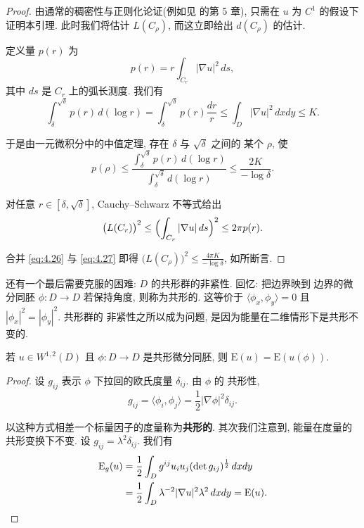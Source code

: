 \begin{proof}
由通常的稠密性与正则化论证(例如见 \cite{Ev} 的第 5 章), 只需在 $u$ 为
$C^1$ 的假设下证明本引理. 此时我们将估计 $L(C_\rho)$, 而这立即给出
$d(C_\rho)$ 的估计.

定义量 $p(r)$ 为
\begin{equation}
p(r)=r\int_{C_r}|\nabla u|^2\,ds,
\label{eq:4.24}
\end{equation}
其中 $ds$ 是 $C_r$ 上的弧长测度. 我们有
\begin{equation}
\int_\delta^{\sqrt{\delta}}p(r)\,d(\log r)
 =\int_\delta^{\sqrt{\delta}}p(r)\frac{dr}{r}
 \leq\int_D|\nabla u|^2\,dxdy\leq K.
\label{eq:4.25}
\end{equation}

于是由一元微积分中的中值定理, 存在 $\delta$ 与 $\sqrt{\delta}$ 之间的
某个 $\rho$, 使
\begin{equation}
p(\rho)\leq
 \frac{\int_\delta^{\sqrt{\delta}}p(r)\,d(\log r)}
      {\int_\delta^{\sqrt{\delta}}d(\log r)}
 \leq\frac{2K}{-\log\delta}.
\label{eq:4.26}
\end{equation}

对任意 $r\in[\delta,\sqrt{\delta}]$, Cauchy--Schwarz 不等式给出
\begin{equation}
\bigl(L(C_r)\bigr)^2\leq\Bigl(\int_{C_r}|\nabla u|\,ds\Bigr)^2
 \leq 2\pi p(r).
\label{eq:4.27}
\end{equation}

合并 \eqref{eq:4.26} 与 \eqref{eq:4.27} 即得
$\bigl(L(C_\rho)\bigr)^2\leq\frac{4\pi K}{-\log\delta}$, 如所断言.
\end{proof}

还有一个最后需要克服的困难: $D$ 的共形群的非紧性. 回忆: 把边界映到
边界的微分同胚 $\phi:D\to D$ 若保持角度, 则称为共形的. 这等价于
$\langle\phi_x,\phi_y\rangle=0$ 且 $|\phi_x|^2=|\phi_y|^2$. 共形群的
非紧性之所以成为问题, 是因为能量在二维情形下是共形不变的.

\begin{lemma}
\label{lem:4.12}
若 $u\in W^{1,2}(D)$ 且 $\phi:D\to D$ 是共形微分同胚, 则
$\mathrm{E}(u)=\mathrm{E}(u(\phi))$.
\end{lemma}

\begin{proof}
设 $g_{ij}$ 表示 $\phi$ 下拉回的欧氏度量 $\delta_{ij}$. 由 $\phi$ 的
共形性,
\begin{equation}
g_{ij}=\langle\phi_i,\phi_j\rangle=\frac12|\nabla\phi|^2\delta_{ij}.
\label{eq:4.28}
\end{equation}

以这种方式相差一个标量因子的度量称为\textbf{共形的}. 其次我们注意到,
能量在度量的共形变换下不变. 设 $g_{ij}=\lambda^2\delta_{ij}$. 我们有
\begin{equation}
\begin{aligned}
\mathrm{E}_g(u)&=\frac12\int_Dg^{ij}u_iu_j(\det g_{ij})^{\frac12}\,dxdy\\
&=\frac12\int_D\lambda^{-2}|\nabla u|^2\lambda^2\,dxdy=\mathrm{E}(u).\qedhere
\end{aligned}
\label{eq:4.29}
\end{equation}
\end{proof}

